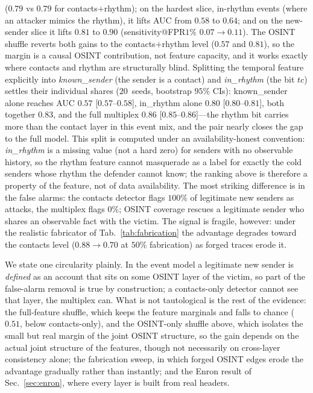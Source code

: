 \documentclass[conference]{IEEEtran}
\begin{document}
($0.79$ vs $0.79$ for contacts$+$rhythm); on the hardest slice, in-rhythm events (where an attacker mimics
the rhythm), it lifts AUC from $0.58$ to $0.64$; and on the new-sender slice it lifts $0.81$ to $0.90$
(sensitivity@FPR$1\%$ $0.07\!\to\!0.11$). The OSINT shuffle reverts both gains to the contacts$+$rhythm level
($0.57$ and $0.81$), so the margin is a causal OSINT contribution, not feature capacity, and it works
exactly where contacts and rhythm are structurally blind.
Splitting the temporal feature explicitly into \emph{known\_sender} (the sender is a contact) and
\emph{in\_rhythm} (the bit $tc$) settles their individual shares ($20$~seeds, bootstrap $95\%$ CIs):
known\_sender alone reaches AUC $0.57$ [$0.57$--$0.58$], in\_rhythm alone $0.80$ [$0.80$--$0.81$], both
together $0.83$, and the
full multiplex $0.86$ [$0.85$--$0.86$]---the rhythm bit carries more than the contact layer in this event
mix, and the pair nearly closes the gap to the full model. This split is computed under an
availability-honest convention: \emph{in\_rhythm} is a missing value (not a hard zero) for senders with no
observable history, so the rhythm feature cannot masquerade as a label for exactly the cold senders whose
rhythm the defender cannot know; the ranking above is therefore a property of the feature, not of data
availability.
The most striking difference is in the false alarms: the contacts
detector flags $100\%$ of legitimate new senders as attacks, the multiplex flags $0\%$; OSINT coverage rescues
a legitimate sender who shares an observable fact with the victim. The signal is fragile, however: under
the realistic fabricator of Tab.~\ref{tab:fabrication} the advantage degrades toward the contacts level
($0.88\!\to\!0.70$ at $50\%$ fabrication) as forged traces erode it.

We state one circularity plainly. In the event model a legitimate new sender is \emph{defined} as an account
that sits on some OSINT layer of the victim, so part of the false-alarm removal is true by construction; a
contacts-only detector cannot see that layer, the multiplex can. What is not tautological is the rest of the
evidence: the full-feature shuffle, which keeps the feature marginals and falls to chance ($0.51$, below
contacts-only), and the OSINT-only shuffle above, which isolates the small but real margin of the joint OSINT
structure, so the gain depends on the actual joint structure of the features, though not necessarily on
cross-layer consistency alone; the fabrication sweep, in which forged OSINT edges erode the advantage
gradually rather than instantly; and the Enron result of Sec.~\ref{sec:enron}, where every layer is built
from real headers.
\end{document}
